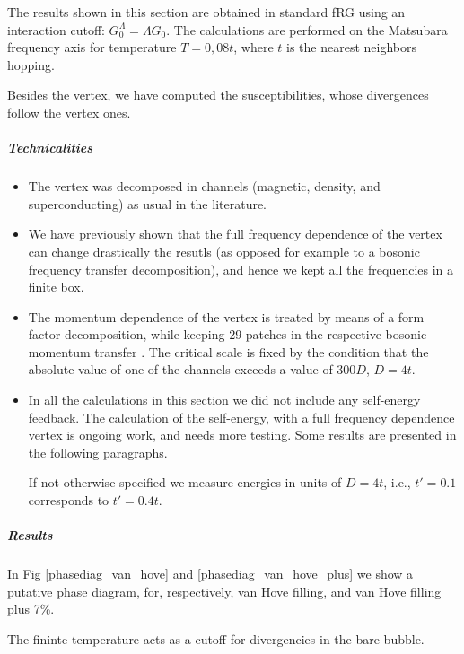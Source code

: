 The results shown in this section are obtained in standard fRG using an interaction cutoff: $G_0^\Lambda = \Lambda G_0$. The calculations are performed on the Matsubara frequency axis for temperature $T=0,08 t$, where $t$ is the nearest neighbors hopping.  

Besides the vertex, we have computed the susceptibilities, whose divergences follow the vertex ones. 

\subparagraph{Technicalities}
\begin{itemize} 

\item The vertex was decomposed in channels (magnetic, density, and superconducting) as usual in the literature. 

\item We have previously shown that the full frequency dependence of the vertex can change drastically the resutls (as opposed for example to a bosonic frequency transfer decomposition), and hence we kept all the frequencies in a finite box. 

\item The momentum dependence of the vertex is treated by means of a form factor decomposition, while keeping 29 patches in the respective bosonic momentum transfer . The critical scale is fixed by the condition that the absolute value of one of the channels exceeds a value of 300$D$, $D=4t$. 


\item In all the calculations in this section we did not include any self-energy feedback. The calculation of the self-energy, with a full frequency dependence vertex  is ongoing work, and needs more testing. Some results are presented in the following paragraphs. 
 
If not otherwise specified we measure energies in units of $D=4t$, i.e., $t'=0.1$ corresponds to $t'=0.4t$.
\end{itemize} 
 
\subparagraph{Results} 

In Fig \ref{phasediag_van_hove} and \ref{phasediag_van_hove_plus} we show  a putative phase diagram, for, respectively, van Hove filling, and van Hove filling plus 7\%. 

The fininte temperature acts as a cutoff for divergencies in the bare bubble. 

